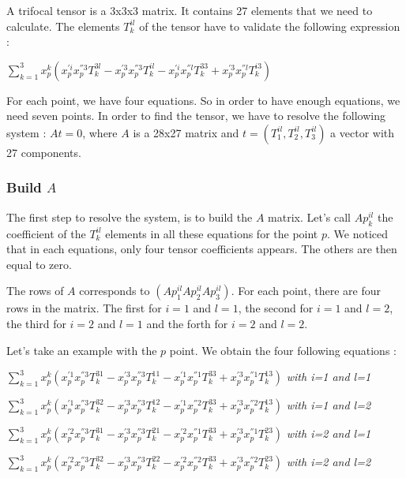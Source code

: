 \documentclass{report}
\begin{document}
A trifocal tensor is a 3x3x3 matrix. It contains 27 elements that we need to calculate. The elements $T_{k}^{il}$ of the tensor have to validate the following expression : 
\begin{center}
 $ \displaystyle { \sum_{k = 1}^{3}} x_{p}^{k}(x_{p}^{'i}x_{p}^{''3}T_{k}^{3l} - x_{p}^{'3}x_{p}^{''3}T_{k}^{il} - x_{p}^{'i}x_{p}^{''l}T_{k}^{33} + x_{p}^{'3}x_{p}^{''l}T_{k}^{i3})$ 
\end{center}
For each point, we have four equations. So in order to have enough equations, we need seven points. 
In order to find the tensor, we have to resolve the following system : $At = 0$, where $A$ is a 28x27 matrix and $t = ( T_{1}^{il}, T_{2}^{il}, T_{3}^{il})$ a vector with 27 components.

\subsubsection{Build $A$}
The first step to resolve the system, is to build the $A$ matrix. Let's call $Ap_{k}^{il}$ the coefficient of the $T_{k}^{il}$ elements in all these equations for the point $p$. We noticed that in each equations, only four tensor coefficients appears. The others are then equal to zero. 

The rows of $A$ corresponds to $( Ap_{1}^{il}  Ap_{2}^{il}  Ap_{3}^{il} )$.
For each point, there are four rows in the matrix. The first for $i=1$ and $l=1$, the second for $i=1$ and $l=2$, the third for $i=2$ and $l=1$ and the forth for $i=2$ and $l=2$.


Let's take an example with the $p$ point. 
We obtain the four following equations : 
\begin{center}
 $ \displaystyle { \sum_{k = 1}^{3}} x_{p}^{k}(x_{p}^{'1}x_{p}^{''3}T_{k}^{31} - x_{p}^{'3}x_{p}^{''3}T_{k}^{11} - x_{p}^{'1}x_{p}^{''1}T_{k}^{33} + x_{p}^{'3}x_{p}^{''1}T_{k}^{13})$  \textit{with i=1 and l=1}
\end{center}
\begin{center}
 $ \displaystyle { \sum_{k = 1}^{3}} x_{p}^{k}(x_{p}^{'1}x_{p}^{''3}T_{k}^{32} - x_{p}^{'3}x_{p}^{''3}T_{k}^{12} - x_{p}^{'1}x_{p}^{''2}T_{k}^{33} + x_{p}^{'3}x_{p}^{''2}T_{k}^{13})$  \textit{with i=1 and l=2} 
\end{center}
\begin{center}
 $ \displaystyle { \sum_{k = 1}^{3}} x_{p}^{k}(x_{p}^{'2}x_{p}^{''3}T_{k}^{31} - x_{p}^{'3}x_{p}^{''3}T_{k}^{21} - x_{p}^{'2}x_{p}^{''1}T_{k}^{33} + x_{p}^{'3}x_{p}^{''1}T_{k}^{23})$  \textit{with i=2 and l=1} 
\end{center}
\begin{center}
 $ \displaystyle { \sum_{k = 1}^{3}} x_{p}^{k}(x_{p}^{'2}x_{p}^{''3}T_{k}^{32} - x_{p}^{'3}x_{p}^{''3}T_{k}^{22} - x_{p}^{'2}x_{p}^{''2}T_{k}^{33} + x_{p}^{'3}x_{p}^{''2}T_{k}^{23})$  \textit{with i=2 and l=2} 
\end{center}
\end{document}
